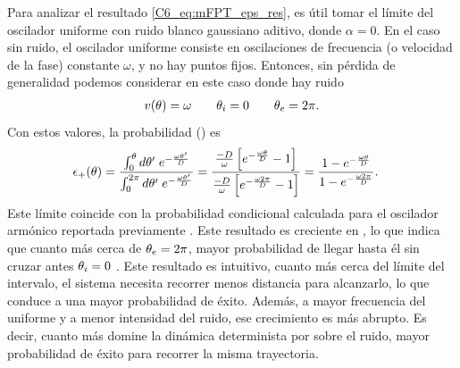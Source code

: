 \documentclass[./main.tex]{subfiles}
\begin{document}
Para analizar el resultado \ref{C6_eq:mFPT_eps_res}, es útil tomar el límite del oscilador uniforme con ruido blanco gaussiano aditivo, donde $\alpha = 0$. En el caso sin ruido, el oscilador uniforme consiste en oscilaciones de frecuencia (o velocidad de la fase) constante $\omega$, y no hay puntos fijos. Entonces, sin pérdida de generalidad podemos considerar en este caso donde hay ruido
\begin{align}
    v(\theta) = \omega \qquad 
    \theta_i = 0 \qquad \theta_e = 2 \pi.
    \label{C6_eq:mFPT_uniforme}
\end{align}
Con estos valores, la probabilidad \epsplus(\xx) es
\begin{align}
     \epsilon_{+}(\theta) & = \frac{\int_{0}^\theta d\theta'\; e^{- \frac{\omega \theta'}{D}}}{\int_{0}^{2\pi} d\theta'\; e^{- \frac{\omega \theta'}{D}}}
      = \frac{\frac{-D}{\omega} \left[e^{- \frac{\omega \theta}{D}} - 1\right]}{\frac{-D}{\omega} \left[e^{- \frac{\omega 2\pi}{D}} - 1\right]} = \frac{ 1 - e^{- \frac{\omega \theta}{D}}}{1- e^{- \frac{\omega 2\pi}{D}}}.
\end{align}
Este límite coincide con la probabilidad condicional calculada para el oscilador armónico reportada previamente \cite{Redner2001}. Este resultado es creciente en \xx, lo que indica que cuanto más cerca de $\theta_e = 2\pi$, mayor probabilidad de llegar hasta él sin cruzar antes $\theta_i = 0$ . Este resultado es intuitivo, cuanto más cerca del límite \xxe del intervalo, el sistema necesita recorrer menos distancia para alcanzarlo, lo que conduce a una mayor probabilidad de éxito. Además, a mayor frecuencia del uniforme y a menor intensidad del ruido, ese crecimiento es más abrupto. Es decir, cuanto más domine la dinámica determinista por sobre el ruido, mayor probabilidad de éxito para recorrer la misma trayectoria. 
\end{document}
